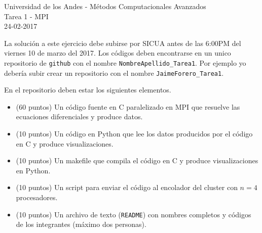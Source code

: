 \documentclass[11pt,letterpaper]{exam}
\begin{document}
\begin{center}
{\Large Universidad de los Andes - M\'etodos Computacionales Avanzados} \\
Tarea 1 - \textsc{MPI}\\
24-02-2017\\
\end{center}

\vspace{0.3cm}


\noindent
La solución a este ejercicio debe subirse por SICUA antes de las 6:00PM
del viernes 10 de marzo del 2017. 
Los c\'odigos deben encontrarse en un unico repositorio de \verb'github'
con el nombre \verb"NombreApellido_Tarea1". Por ejemplo yo deber\'ia
subir crear un repositorio con el nombre \verb"JaimeForero_Tarea1". 

\noindent
En el repositorio deben estar los siguientes elementos.
\begin{itemize}
\item (60 puntos) Un c\'odigo fuente en C paralelizado en MPI que resuelve las ecuaciones diferenciales y produce datos.
\item (10 puntos) Un c\'odigo en Python que lee los datos producidos por el
  c\'odigo en C y produce visualizaciones.
\item (10 puntos) Un makefile que compila el c\'odigo en C y produce visualizaciones en Python.
\item (10 puntos) Un script para enviar el c\'odigo al encolador del cluster con $n=4$ procesadores.
\item (10 puntos) Un archivo de texto (\verb"README") con nombres completos y c\'odigos de los integrantes (m\'aximo dos personas).
\end{itemize}

\vspace{0.3cm}
\end{document}
